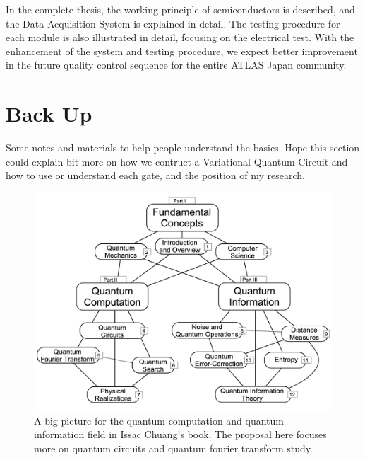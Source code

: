 \documentclass{article}
\begin{document}
\thispagestyle{empty}
In the complete thesis, the working principle of
semiconductors is described, and the Data Acquisition System is explained in detail. The testing procedure for each module
is also illustrated in detail, focusing on the electrical test. 
With the enhancement of the system and testing procedure, we expect better 
improvement in the future quality control sequence for the entire ATLAS Japan community. 


\section*{Back Up}
Some notes and materials to help people understand the basics. Hope this 
section could explain bit more on how we contruct a Variational Quantum 
Circuit and how to use or understand each gate, and the position of my 
research. 
\begin{figure}
  \includegraphics[width=\textwidth]{category.png}
  \caption{A big picture for the quantum computation and 
  quantum information field in Issac Chuang's book. The proposal 
  here focuses more on quantum circuits and quantum fourier transform study. }
\end{figure}
\end{document}
